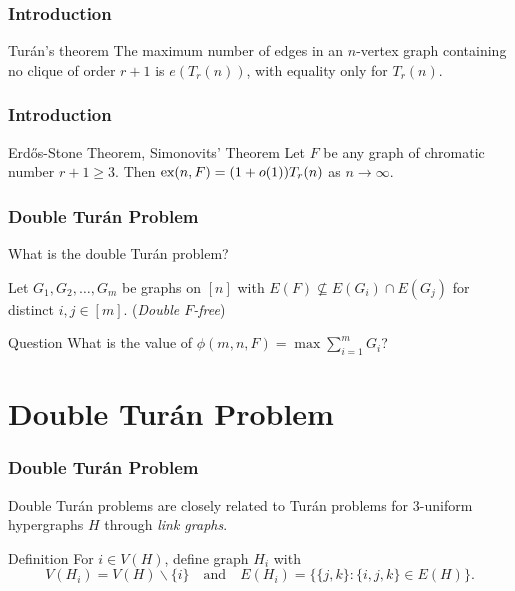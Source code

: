 \documentclass{beamer}
\newcommand*{\ex}{\textnormal{ex}}
\begin{document}
\begin{frame}
  \frametitle{Introduction}

  \begin{block}{Turán's theorem}
    The maximum number of edges in an $n$-vertex graph containing no clique of order $r + 1$ is $e(T_r(n))$, with equality only for $T_r(n)$.
  \end{block}
\end{frame}

\begin{frame}
  \frametitle{Introduction}

  \begin{block}{Erd\H{o}s-Stone Theorem, Simonovits' Theorem}
    Let $F$ be any graph of chromatic number $r + 1 \geq 3$. Then $\ex(n, F) = (1 + o(1))T_r(n)$ as $n \rightarrow \infty$.
  \end{block}
\end{frame}

\begin{frame}
\frametitle{Double Turán Problem}

What is the double Turán problem? \pause

\vspace{0.5cm}

Let $G_1, G_2, \ldots, G_m$ be graphs on $[n]$ with $E(F) \not\subseteq E(G_i) \cap E(G_j)$ for distinct $i, j \in [m]$. \pause (\textit{Double $F$-free})

\pause

\begin{block}{Question}
  What is the value of $\phi(m, n, F) = \max \sum_{i = 1}^m G_i$?
\end{block}
\end{frame}

\section{Double Turán Problem}

\begin{frame}
  \frametitle{Double Turán Problem}

  Double Turán problems are closely related to Turán problems for $3$-uniform hypergraphs $H$ through \textit{link graphs}.

  \pause

  \vspace{0.3cm}

  \begin{block}{Definition}
    For $i \in V(H)$, define graph $H_i$ with
    \[
      V(H_i) = V(H) \backslash \{i\} \quad \text{and} \quad E(H_i) = \{\{j, k\} : \{i, j, k\} \in E(H)\}.
    \]
  \end{block}
\end{frame}
\end{document}
